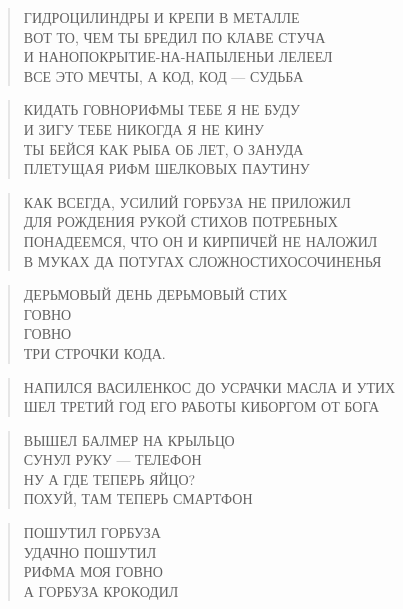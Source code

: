 \poemtitle{***}
\begin{verse}
ГИДРОЦИЛИНДРЫ И КРЕПИ В МЕТАЛЛЕ\\
ВОТ ТО, ЧЕМ ТЫ БРЕДИЛ ПО КЛАВЕ СТУЧА\\
И НАНОПОКРЫТИЕ-НА-НАПЫЛЕНЬИ ЛЕЛЕЕЛ\\
ВСЕ ЭТО МЕЧТЫ, А КОД, КОД — СУДЬБА
\end{verse}

\poemtitle{***}
\begin{verse}
КИДАТЬ ГОВНОРИФМЫ ТЕБЕ Я НЕ БУДУ\\
И ЗИГУ ТЕБЕ НИКОГДА Я НЕ КИНУ\\
ТЫ БЕЙСЯ КАК РЫБА ОБ ЛЕТ, О ЗАНУДА\\
ПЛЕТУЩАЯ РИФМ ШЕЛКОВЫХ ПАУТИНУ
\end{verse}

\poemtitle{***}
\begin{verse}
КАК ВСЕГДА, УСИЛИЙ ГОРБУЗА НЕ ПРИЛОЖИЛ\\
ДЛЯ РОЖДЕНИЯ РУКОЙ СТИХОВ ПОТРЕБНЫХ \\
ПОНАДЕЕМСЯ, ЧТО ОН И КИРПИЧЕЙ НЕ НАЛОЖИЛ\\
В МУКАХ ДА ПОТУГАХ СЛОЖНОСТИХОСОЧИНЕНЬЯ
\end{verse}

\poemtitle{***}
\begin{verse}
ДЕРЬМОВЫЙ ДЕНЬ ДЕРЬМОВЫЙ СТИХ\\
ГОВНО\\
ГОВНО\\
ТРИ СТРОЧКИ КОДА.
\end{verse}

\poemtitle{***}
\begin{verse}
НАПИЛСЯ ВАСИЛЕНКОС ДО УСРАЧКИ МАСЛА И УТИХ\\
ШЕЛ ТРЕТИЙ ГОД ЕГО РАБОТЫ КИБОРГОМ ОТ БОГА
\end{verse}

\poemtitle{***}
\begin{verse}
ВЫШЕЛ БАЛМЕР НА КРЫЛЬЦО\\
СУНУЛ РУКУ — ТЕЛЕФОН\\
НУ А ГДЕ ТЕПЕРЬ ЯЙЦО?\\
ПОХУЙ, ТАМ ТЕПЕРЬ СМАРТФОН
\end{verse}

\poemtitle{***}
\begin{verse}
ПОШУТИЛ ГОРБУЗА\\
УДАЧНО ПОШУТИЛ\\
РИФМА МОЯ ГОВНО\\
А ГОРБУЗА КРОКОДИЛ
\end{verse}

